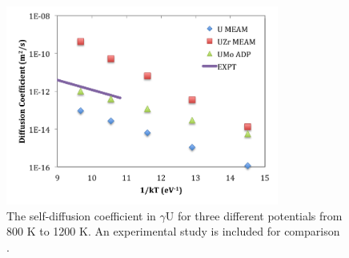 \documentclass[review]{elsarticle}
\begin{document}
\begin{figure}[h]
 \centering
 \includegraphics[width=0.8\textwidth]{self_diff.png} 
 \caption{The self-diffusion coefficient in $\gamma$U for three different potentials from 800 K to 1200 K. An experimental study is included for comparison \cite{adda1959}.}
 \label{fig:gamUdiff}
\end{figure}

\FloatBarrier
\end{document}
